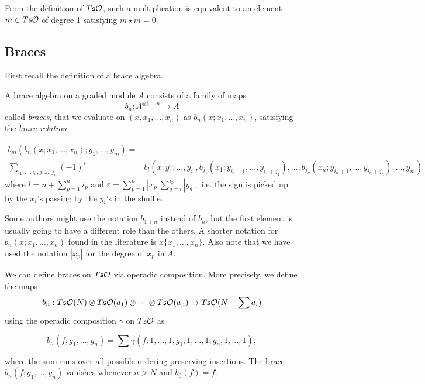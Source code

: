 \documentclass[twoside]{article}
\begin{document}
From the definition of $T\mathfrak{s}{\mathcal O}$, such a multiplication is equivalent to an element $m\in T\mathfrak{s}{\mathcal O}$ of degree 1 satisfying $m\star m=0$.


\subsection{Braces}\label{sectionbraces}
First recall the definition of a brace algebra.

\begin{defi}\label{braces}
A brace algebra on a graded module $A$ consists of a family of maps \[b_n:A^{\otimes 1+n}\to A\] called \emph{braces}, that we evaluate on $(x,x_1,\dots, x_n)$ as $b_n(x;x_1,\dots, x_n)$, satisfying the \emph{brace relation}


\begin{align*}
b_m(b_n(x;x_1,\dots, x_n);y_1,\dots,y_m)=&\\
\sum_{i_1,\dots, i_n, j_1\dots, j_n}(-1)^{\varepsilon}&b_l(x; y_1,\dots, y_{i_1},b_{j_1}(x_1;y_{i_1+1},\dots, y_{i_1+j_1}),\dots, b_{j_n}(x_n;y_{i_n+1},\dots, y_{i_n+j_n}),\dots,y_m)
\end{align*}
where $l=n+\sum_{p=1}^n i_p$ and $\varepsilon=\sum_{p=1}^n|x_p|\sum_{q=i}^{i_p}|y_q|,$ i.e. the sign is picked up by the $x_i$'s passing by the $y_i$'s in the shuffle.



\end{defi}

\begin{remark}
Some authors might use the notation $b_{1+n}$ instead of $b_n$, but the first element is usually going to have a different role than the others. A shorter notation for $b_n(x;x_1,\dots,x_n)$ found in the literature is $x\{x_1,\dots, x_n\}$. Also note that we have used the notation $|x_p|$ for the degree of $x_p$ in $A$. 
\end{remark}

We can define braces on $T\mathfrak{s}{\mathcal O}$ via operadic composition. More precisely, we define the maps 
$$b_n:T\mathfrak{s}{\mathcal O}(N)\otimes T\mathfrak{s}{\mathcal O}(a_1)\otimes\cdots\otimes T\mathfrak{s}{\mathcal O}(a_n)\to T\mathfrak{s}{\mathcal O}(N-\sum a_i)$$
using the operadic composition $\gamma$ on $T\mathfrak{s}{\mathcal O}$ as

\[b_n(f;g_1,\dots,g_n)=\sum\gamma(f;1,\dots,1,g_1,1,\dots,1,g_n,1,\dots,1),\]

where the sum runs over all possible ordering preserving insertions. The brace $b_n(f;g_1,\dots,g_n)$ vanishes whenever $n>N$ and $b_0(f)=f$.
\end{document}
